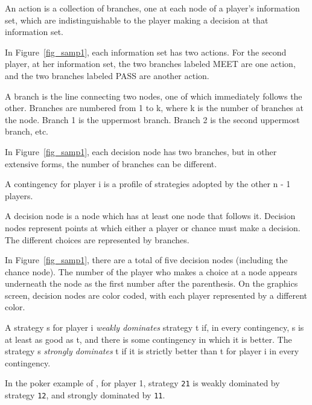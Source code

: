 \documentclass[12pt]{report}
\begin{document}
\begin{helpglossary}
%
\setfooter{\thepage}{}{}{}{}{\thepage}%

\label{actiongloss}
An action is a collection of branches, one at each node of a player's information 
set, which are indistinguishable to the player making a decision at that 
information set. 

In Figure~\ref{fig_samp1}, each information set has two actions.  For the 
second player, at her information set, the two branches labeled MEET are one 
action, and the two branches labeled PASS are another action.
 
\label{branchgloss}
A branch is the line connecting two nodes, one of which immediately 
follows the other.  Branches are numbered from 1 to k, where k is the 
number of branches at the node.  Branch 1 is the uppermost branch.  Branch 
2 is the second uppermost branch, etc. 

In Figure~\ref{fig_samp1}, each decision node has two branches, but in
other extensive forms, the number of branches can be different.

\label{continggloss}
A contingency for player i is a profile of strategies adopted by the other
 n - 1 players.

\label{decnodegloss}
A decision node is a node which has at least one node that follows it.  
Decision nodes represent points at which either a player or chance must 
make a decision.  The different choices are represented by branches.

In Figure~\ref{fig_samp1}, there are a total of five decision nodes (including the chance node). 
 The number of the player who makes a choice at a node appears underneath the
node as the first number after the parenthesis.  On the graphics screen,
decision nodes are color coded, with each player represented by a
different color.

\label{dominationgloss}
A strategy s for player i 
{\em weakly dominates} strategy t if, in every contingency, s 
is at least as good as t, and there is some contingency in which it is 
better.  The strategy s {\em strongly dominates} t if it is 
strictly better than t for player i in every contingency.  

In the poker example of , 
for player 1, strategy \verb+21+ is weakly dominated by strategy \verb+12+, 
and strongly dominated by \verb+11+. 


\end{helpglossary}
\end{document}
